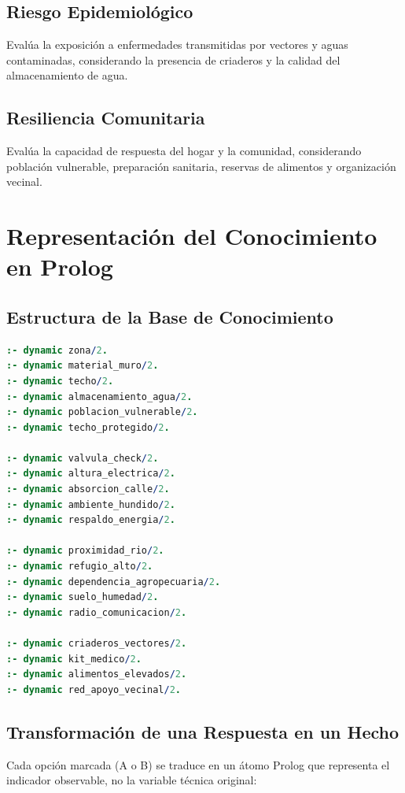 \documentclass[12pt, letterpaper]{article}
\begin{document}
\subsection{Riesgo Epidemiológico}
Evalúa la exposición a enfermedades transmitidas por vectores y aguas contaminadas, considerando la presencia de criaderos y la calidad del almacenamiento de agua.

\subsection{Resiliencia Comunitaria}
Evalúa la capacidad de respuesta del hogar y la comunidad, considerando población vulnerable, preparación sanitaria, reservas de alimentos y organización vecinal.

\section{Representación del Conocimiento en Prolog}

\subsection{Estructura de la Base de Conocimiento}

\begin{lstlisting}[language=Prolog, caption={Base de conocimiento dinámica en Prolog}]
:- dynamic zona/2.
:- dynamic material_muro/2.
:- dynamic techo/2.
:- dynamic almacenamiento_agua/2.
:- dynamic poblacion_vulnerable/2.
:- dynamic techo_protegido/2.

:- dynamic valvula_check/2.
:- dynamic altura_electrica/2.
:- dynamic absorcion_calle/2.
:- dynamic ambiente_hundido/2.
:- dynamic respaldo_energia/2.

:- dynamic proximidad_rio/2.
:- dynamic refugio_alto/2.
:- dynamic dependencia_agropecuaria/2.
:- dynamic suelo_humedad/2.
:- dynamic radio_comunicacion/2.

:- dynamic criaderos_vectores/2.
:- dynamic kit_medico/2.
:- dynamic alimentos_elevados/2.
:- dynamic red_apoyo_vecinal/2.
\end{lstlisting}

\subsection{Transformación de una Respuesta en un Hecho}

Cada opción marcada (A o B) se traduce en un átomo Prolog que representa el indicador observable, no la variable técnica original:
\end{document}
